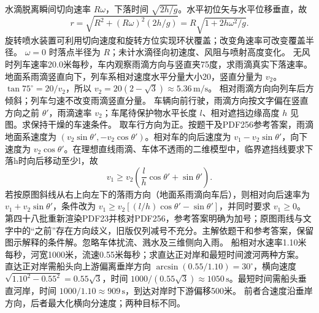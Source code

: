 \workings 水滴脱离瞬间切向速率 $R\omega$，下落时间 $\sqrt{2h/g}$。水平初位矢与水平位移垂直，故
\[
r=\sqrt{R^2+(R\omega)^2(2h/g)}=R\sqrt{1+2h\omega^2/g}.
\]
旋转喷水装置可利用切向速度和旋转方位实现环状覆盖；改变角速率可改变覆盖半径。
\crosscheck $\omega=0$ 时落点半径为 $R$；未计水滴径向初速度、风阻与喷射高度变化。
\problemtext 无风时列车速率20.0米每秒，车内观察雨滴方向与竖直夹75度，求雨滴真实下落速率。
\workings 地面系雨滴竖直向下，列车系相对速度水平分量大小20，竖直分量为 $v_2$。$\tan75^\circ=20/v_2$，所以 $v_2=20(2-\sqrt3)\approx5.36\,\mathrm{m/s}$。
\crosscheck 相对雨滴方向向列车后方倾斜；列车匀速不改变雨滴竖直分量。
\problemtext 车辆向前行驶，雨滴方向按文字偏在竖直方向之前 $\theta'$，雨滴速率 $v_2$；车尾待保护物水平长度 $l$、相对遮挡边缘高度 $h$ 见图。求保持干燥的车速条件。
\workings 取车行方向为正。按题干及PDF256参考答案，雨滴地面系速度为 $(v_2\sin\theta',-v_2\cos\theta')$。相对车的向后速度为 $v_1-v_2\sin\theta'$，向下速度为 $v_2\cos\theta'$。在理想直线雨滴、车体不透雨的二维模型中，临界遮挡线要求下落h时向后移动至少l，故
\[
v_1\ge v_2\left(\frac{l}{h}\cos\theta'+\sin\theta'\right).
\]
若按原图斜线从右上向左下的落雨方向（地面系雨滴向车后），则相对向后速率为 $v_1+v_2\sin\theta'$，条件改为 $v_1\ge v_2[(l/h)\cos\theta'-\sin\theta']$，并同时要求 $v_1\ge0$。
\crosscheck 第四十八批重新渲染PDF23并核对PDF256，参考答案明确为加号；原图雨线与文字中的“之前”存在方向歧义，旧版仅列减号不充分。主解依题干和参考答案，保留图示解释的条件解。忽略车体扰流、溅水及三维侧向入雨。
\problemtext 船相对水速率1.10米每秒，河宽1000米，流速0.55米每秒；求直达正对岸和最短时间渡河两种方案。
\workings 直达正对岸需船头向上游偏离垂岸方向 $\arcsin(0.55/1.10)=30^\circ$，横向速度 $\sqrt{1.10^2-0.55^2}=0.55\sqrt3$，时间 $1000/(0.55\sqrt3)\approx1050\,\mathrm s$。最短时间需船头垂直河岸，时间 $1000/1.10\approx909\,\mathrm s$，到达对岸时下游偏移500米。
\crosscheck 前者合速度沿垂岸方向，后者最大化横向分速度；两种目标不同。
